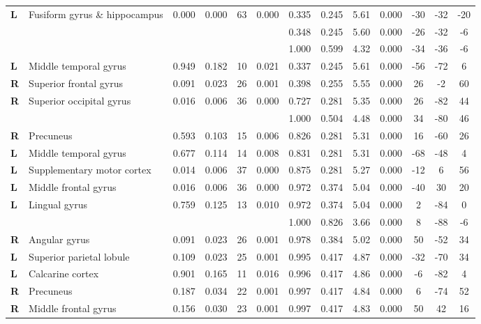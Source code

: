 \begin{landscape}
\begin{table}[!ht]
\begin{tabular}{ll|cccc|cccc|ccc}
        \textbf{L} & Fusiform gyrus \& hippocampus & 0.000 & 0.000 & 63 & 0.000 & 0.335 & 0.245 & 5.61 & 0.000 & -30 & -32 & -20 \\
        & & & & & & 0.348 & 0.245 & 5.60 & 0.000 & -26 & -32 & -6 \\
        & & & & & & 1.000 & 0.599 & 4.32 & 0.000 & -34 & -36 & -6 \\
        \textbf{L} & Middle temporal gyrus & 0.949 & 0.182 & 10 & 0.021 & 0.337 & 0.245 & 5.61 & 0.000 & -56 & -72 & 6 \\
        \textbf{R} & Superior frontal gyrus & 0.091 & 0.023 & 26 & 0.001 & 0.398 & 0.255 & 5.55 & 0.000 & 26 & -2 & 60 \\
        \textbf{R} & Superior occipital gyrus & 0.016 & 0.006 & 36 & 0.000 & 0.727 & 0.281 & 5.35 & 0.000 & 26 & -82 & 44 \\
        & & & & & & 1.000 & 0.504 & 4.48 & 0.000 & 34 & -80 & 46 \\
        \textbf{R} & Precuneus & 0.593 & 0.103 & 15 & 0.006 & 0.826 & 0.281 & 5.31 & 0.000 & 16 & -60 & 26 \\
        \textbf{L} & Middle temporal gyrus & 0.677 & 0.114 & 14 & 0.008 & 0.831 & 0.281 & 5.31 & 0.000 & -68 & -48 & 4 \\
        \textbf{L} & Supplementary motor cortex & 0.014 & 0.006 & 37 & 0.000 & 0.875 & 0.281 & 5.27 & 0.000 & -12 & 6 & 56 \\
        \textbf{L} & Middle frontal gyrus & 0.016 & 0.006 & 36 & 0.000 & 0.972 & 0.374 & 5.04 & 0.000 & -40 & 30 & 20 \\
        \textbf{L} & Lingual gyrus & 0.759 & 0.125 & 13 & 0.010 & 0.972 & 0.374 & 5.04 & 0.000 & 2 & -84 & 0 \\
        & & & & & & 1.000 & 0.826 & 3.66 & 0.000 & 8 & -88 & -6 \\
        \textbf{R} & Angular gyrus & 0.091 & 0.023 & 26 & 0.001 & 0.978 & 0.384 & 5.02 & 0.000 & 50 & -52 & 34 \\
        \textbf{L} & Superior parietal lobule & 0.109 & 0.023 & 25 & 0.001 & 0.995 & 0.417 & 4.87 & 0.000 & -32 & -70 & 34 \\
        \textbf{L} & Calcarine cortex & 0.901 & 0.165 & 11 & 0.016 & 0.996 & 0.417 & 4.86 & 0.000 & -6 & -82 & 4 \\
        \textbf{R} & Precuneus & 0.187 & 0.034 & 22 & 0.001 & 0.997 & 0.417 & 4.84 & 0.000 & 6 & -74 & 52 \\
        \textbf{R} & Middle frontal gyrus & 0.156 & 0.030 & 23 & 0.001 & 0.997 & 0.417 & 4.83 & 0.000 & 50 & 42 & 16 \\

\end{tabular}
\end{table}
\end{landscape}
